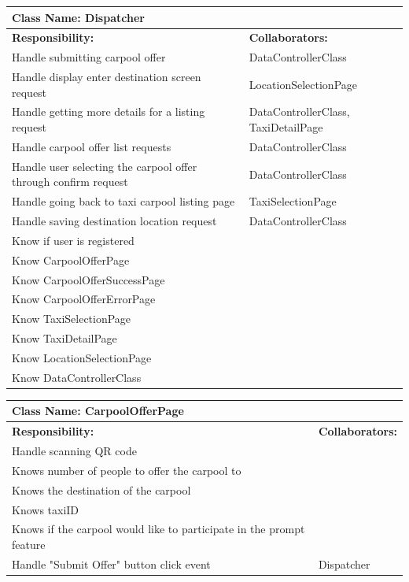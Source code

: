 \documentclass[]{article}
\begin{document}
	\begin{table}[H]
	\centering
	\begin{tabular}{|p{6cm}|p{6cm}|}
	\hline 
		\multicolumn{2}{|l|}{\textbf{Class Name: Dispatcher}} \\
	\hline
	\textbf{Responsibility:} & \textbf{Collaborators:} \\
	\hline
	Handle submitting carpool offer & DataControllerClass\\ \hline
	Handle display enter destination screen request & LocationSelectionPage\\ \hline
	Handle getting more details for a listing request & DataControllerClass, TaxiDetailPage\\ \hline
	Handle carpool offer list requests & DataControllerClass\\ \hline
	Handle user selecting the carpool offer through confirm request & DataControllerClass\\ \hline 
	Handle going back to taxi carpool listing page & TaxiSelectionPage\\ \hline
	Handle saving destination location request & DataControllerClass\\ \hline
	Know if user is registered & \\ \hline
	Know CarpoolOfferPage & \\ \hline 
	Know CarpoolOfferSuccessPage & \\ \hline 
	Know CarpoolOfferErrorPage & \\ \hline 
	Know TaxiSelectionPage & \\ \hline
	Know TaxiDetailPage & \\ \hline
	Know LocationSelectionPage & \\ \hline
	Know DataControllerClass & \\ \hline
	\end{tabular}
	\end{table}

	\begin{table}[H]
	\centering
	\begin{tabular}{|p{6cm}|p{6cm}|}
	\hline 
		\multicolumn{2}{|l|}{\textbf{Class Name: CarpoolOfferPage}} \\
	\hline
	\textbf{Responsibility:} & \textbf{Collaborators:} \\
	\hline
	Handle scanning QR code &  \\ \hline
	Knows number of people to offer the carpool to &\\ \hline
	Knows the destination of the carpool &\\ \hline
	Knows taxiID &\\ \hline
	Knows if the carpool would like to participate in the prompt feature & \\ \hline
	Handle "Submit Offer" button click event  & Dispatcher\\ \hline
	\end{tabular}
	\end{table}
\end{document}
